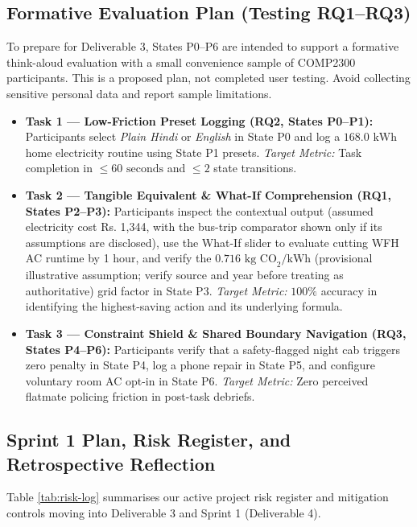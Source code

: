 \documentclass[12pt, a4paper]{article}
\begin{document}
\subsection{Formative Evaluation Plan (Testing RQ1--RQ3)}
To prepare for Deliverable 3, States P0--P6 are intended to support a formative think-aloud evaluation with a small convenience sample of COMP2300 participants. This is a proposed plan, not completed user testing. Avoid collecting sensitive personal data and report sample limitations.
\begin{itemize}
    \item \textbf{Task 1 --- Low-Friction Preset Logging (\textbf{RQ2}, States P0--P1):} Participants select \textit{Plain Hindi} or \textit{English} in State P0 and log a $168.0\text{ kWh}$ home electricity routine using State P1 presets. \textit{Target Metric:} Task completion in $\le 60\text{ seconds}$ and $\le 2$ state transitions.
    \item \textbf{Task 2 --- Tangible Equivalent \& What-If Comprehension (\textbf{RQ1}, States P2--P3):} Participants inspect the contextual output (assumed electricity cost Rs. 1,344, with the bus-trip comparator shown only if its assumptions are disclosed), use the What-If slider to evaluate cutting WFH AC runtime by 1 hour, and verify the $0.716\text{ kg CO}_2\text{/kWh}$ (provisional illustrative assumption; verify source and year before treating as authoritative) grid factor in State P3. \textit{Target Metric:} $100\%$ accuracy in identifying the highest-saving action and its underlying formula.
    \item \textbf{Task 3 --- Constraint Shield \& Shared Boundary Navigation (\textbf{RQ3}, States P4--P6):} Participants verify that a safety-flagged night cab triggers zero penalty in State P4, log a phone repair in State P5, and configure voluntary room AC opt-in in State P6. \textit{Target Metric:} Zero perceived flatmate policing friction in post-task debriefs.
\end{itemize}

\subsection{Sprint 1 Plan, Risk Register, and Retrospective Reflection}
Table \ref{tab:risk-log} summarises our active project risk register and mitigation controls moving into Deliverable 3 and Sprint 1 (Deliverable 4).
\end{document}
